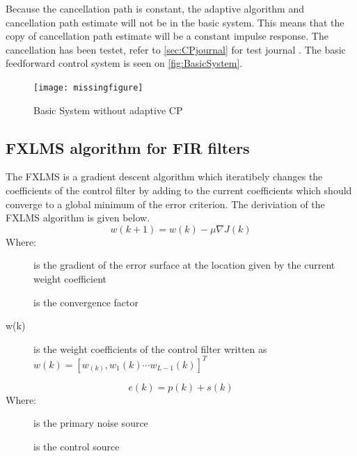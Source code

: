 Because the cancellation path is constant, the adaptive algorithm and cancellation path estimate will not be in the basic system. This means that the copy of cancellation path estimate will be a constant impulse response. The cancellation has been testet, refer to \autoref{sec:CPjournal} for test journal . The basic feedforward control system is seen on \autoref{fig:BasicSystem}. 

\begin{figure}[H]
	\centering
	\texttt{[image: missingfigure]}
	\caption{Basic System without adaptive CP}
	\label{fig:BasicSystem}
\end{figure}   






\subsection*{FXLMS algorithm for FIR filters}\label{subsec:fxlms}
The FXLMS is a gradient descent algorithm which iteratibely changes the coefficients of the control filter by adding to the current coefficients which should converge to a global minimum of the error criterion. The deriviation of the FXLMS algorithm is given below. 
\begin{equation}\label{eq:1}
w(k+1) = w(k) - \mu\nabla J(k)
\end{equation}
Where:
\begin{description}
	\item[] is the gradient of the error surface at the location given by the current weight coefficient
	\item[\text{$\mu$}] is the convergence factor
	\item[w(k)] is the weight coefficients of the control filter written as  $w(k)=[w_(k),w_1(k) \cdots w_{L-1}(k)]^T$
\end{description}

\begin{equation}\label{eq:2}
e(k) = p(k) + s(k)
\end{equation}
Where:
\begin{description}
	\item[] is the primary noise source
	\item[] is the control source
\end{description}

